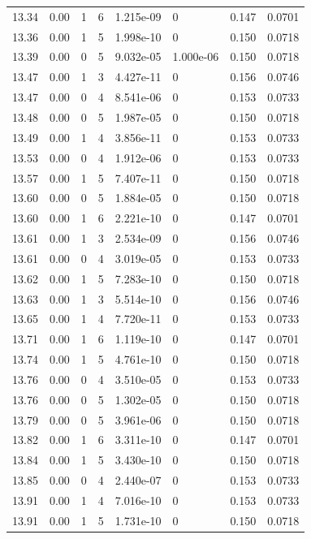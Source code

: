 \documentclass[preview]{standalone}
\begin{document}
{{{{{{{{{{{{{\begin{tabular}{L{1.2cm}C{1.2cm} C{0.3cm}C{0.5cm} C{1.4cm}C{1.4cm} C{1.4cm}C{1.4cm}}
  13.34  &  0.00  & 1     &  6 &  1.215e-09  & 0  & 0.147 &  0.0701   \\ 
  13.36  &  0.00  & 1     &  5 &  1.998e-10  & 0  & 0.150 &  0.0718   \\ 
  13.39  &  0.00  & 0     &  5 &  9.032e-05  & 1.000e-06  & 0.150 &  0.0718   \\ 
  13.47  &  0.00  & 1     &  3 &  4.427e-11  & 0  & 0.156 &  0.0746   \\ 
  13.47  &  0.00  & 0     &  4 &  8.541e-06  & 0  & 0.153 &  0.0733   \\ 
  13.48  &  0.00  & 0     &  5 &  1.987e-05  & 0  & 0.150 &  0.0718   \\ 
  13.49  &  0.00  & 1     &  4 &  3.856e-11  & 0  & 0.153 &  0.0733   \\ 
  13.53  &  0.00  & 0     &  4 &  1.912e-06  & 0  & 0.153 &  0.0733   \\ 
  13.57  &  0.00  & 1     &  5 &  7.407e-11  & 0  & 0.150 &  0.0718   \\ 
  13.60  &  0.00  & 0     &  5 &  1.884e-05  & 0  & 0.150 &  0.0718   \\ 
  13.60  &  0.00  & 1     &  6 &  2.221e-10  & 0  & 0.147 &  0.0701   \\ 
  13.61  &  0.00  & 1     &  3 &  2.534e-09  & 0  & 0.156 &  0.0746   \\ 
  13.61  &  0.00  & 0     &  4 &  3.019e-05  & 0  & 0.153 &  0.0733   \\ 
  13.62  &  0.00  & 1     &  5 &  7.283e-10  & 0  & 0.150 &  0.0718   \\ 
  13.63  &  0.00  & 1     &  3 &  5.514e-10  & 0  & 0.156 &  0.0746   \\ 
  13.65  &  0.00  & 1     &  4 &  7.720e-11  & 0  & 0.153 &  0.0733   \\ 
  13.71  &  0.00  & 1     &  6 &  1.119e-10  & 0  & 0.147 &  0.0701   \\ 
  13.74  &  0.00  & 1     &  5 &  4.761e-10  & 0  & 0.150 &  0.0718   \\ 
  13.76  &  0.00  & 0     &  4 &  3.510e-05  & 0  & 0.153 &  0.0733   \\ 
  13.76  &  0.00  & 0     &  5 &  1.302e-05  & 0  & 0.150 &  0.0718   \\ 
  13.79  &  0.00  & 0     &  5 &  3.961e-06  & 0  & 0.150 &  0.0718   \\ 
  13.82  &  0.00  & 1     &  6 &  3.311e-10  & 0  & 0.147 &  0.0701   \\ 
  13.84  &  0.00  & 1     &  5 &  3.430e-10  & 0  & 0.150 &  0.0718   \\ 
  13.85  &  0.00  & 0     &  4 &  2.440e-07  & 0  & 0.153 &  0.0733   \\ 
  13.91  &  0.00  & 1     &  4 &  7.016e-10  & 0  & 0.153 &  0.0733   \\ 
  13.91  &  0.00  & 1     &  5 &  1.731e-10  & 0  & 0.150 &  0.0718   \\ 
\hline 
\end{tabular} 

}}}}}}}}}}}}}
\end{document}
